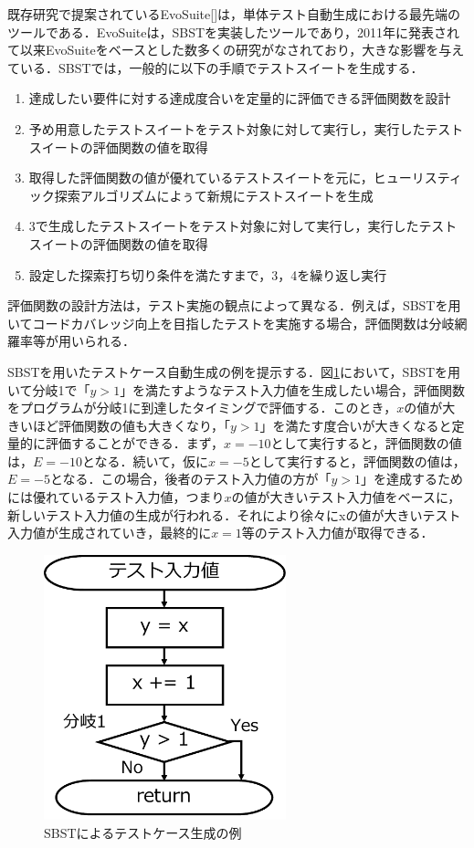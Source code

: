 \documentclass[12pt]{jarticle} %
\begin{document}
既存研究で提案されているEvoSuite[]は，単体テスト自動生成における最先端のツールである．EvoSuiteは，SBSTを実装したツールであり，2011年に発表されて以来EvoSuiteをベースとした数多くの研究がなされており，大きな影響を与えている．SBSTでは，一般的に以下の手順でテストスイートを生成する．

\begin{enumerate}
  \item 達成したい要件に対する達成度合いを定量的に評価できる評価関数を設計
  \item 予め用意したテストスイートをテスト対象に対して実行し，実行したテストスイートの評価関数の値を取得
  \item 取得した評価関数の値が優れているテストスイートを元に，ヒューリスティック探索アルゴリズムによぅて新規にテストスイートを生成
  \item 3で生成したテストスイートをテスト対象に対して実行し，実行したテストスイートの評価関数の値を取得
  \item 設定した探索打ち切り条件を満たすまで，3，4を繰り返し実行
\end{enumerate}

評価関数の設計方法は，テスト実施の観点によって異なる．例えば，SBSTを用いてコードカバレッジ向上を目指したテストを実施する場合，評価関数は分岐網羅率等が用いられる．

SBSTを用いたテストケース自動生成の例を提示する．図\ref{SBST}において，SBSTを用いて分岐1で「$y > 1$」を満たすようなテスト入力値を生成したい場合，評価関数をプログラムが分岐1に到達したタイミングで評価する．このとき，$x$の値が大きいほど評価関数の値も大きくなり，「$y > 1$」を満たす度合いが大きくなると定量的に評価することができる．まず，$x = -10$として実行すると，評価関数の値は，$E = -10$となる．続いて，仮に$x = -5$として実行すると，評価関数の値は，$E = -5$となる．この場合，後者のテスト入力値の方が「$y > 1$」を達成するためには優れているテスト入力値，つまり$x$の値が大きいテスト入力値をベースに，新しいテスト入力値の生成が行われる．それにより徐々にxの値が大きいテスト入力値が生成されていき，最終的に$x = 1$等のテスト入力値が取得できる．

\begin{figure}[htbp]
  \begin{center}
    \includegraphics[clip,width=7cm]{SBST.pdf}
    \caption{SBSTによるテストケース生成の例}
    \label{SBST}
  \end{center}
\end{figure}
\end{document}
